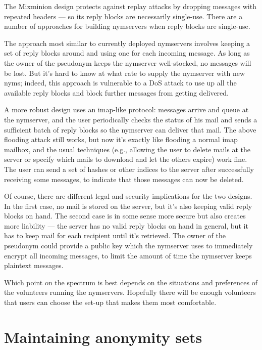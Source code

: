 \documentclass{llncs}
\begin{document}
The Mixminion design protects against replay attacks by dropping
messages with repeated headers --- so its reply blocks are necessarily
single-use. There are a number of approaches for building nymservers
when reply blocks are single-use.

The approach most similar to currently deployed nymservers involves
keeping a set of reply blocks around and using one for each incoming
message. As long as the owner of the pseudonym keeps the nymserver
well-stocked, no messages will be lost. But it's hard to know at what
rate to supply the nymserver with new nyms; indeed, this approach is
vulnerable to a DoS attack to use up all the available reply blocks and
block further messages from getting delivered.

A more robust design uses an imap-like protocol: messages arrive and queue
at the nymserver, and the user periodically checks the status of his mail
and sends a sufficient batch of reply blocks so the nymserver can deliver
that mail. The above flooding attack still works, but now it's exactly
like flooding a normal imap mailbox, and the usual techniques (e.g.,
allowing the user to delete mails at the server or specify which mails to
download and let the others expire) work fine. The user can send a set
of hashes or other indices to the server after successfully receiving
some messages, to indicate that those messages can now be deleted.

Of course, there are different legal and security implications for the two
designs. In the first case, no mail is stored on the server, but it's also
keeping valid reply blocks on hand. The second case is in some sense more
secure but also creates more liability --- the server has no valid reply
blocks on hand in general, but it has to keep mail for each recipient
until it's retrieved. The owner of the pseudonym could provide a public
key which the nymserver uses to immediately encrypt all incoming messages,
to limit the amount of time the nymserver keeps plaintext messages.

Which point on the spectrum is best depends on the situations and
preferences of the volunteers running the nymservers. Hopefully there
will be enough volunteers that users can choose the set-up that makes
them most comfortable.


\section{Maintaining anonymity sets}
\end{document}
